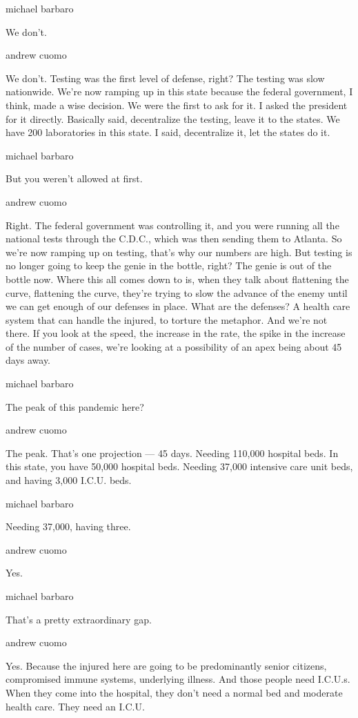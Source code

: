 michael barbaro

We don't.

andrew cuomo

We don't. Testing was the first level of defense, right? The testing was
slow nationwide. We're now ramping up in this state because the federal
government, I think, made a wise decision. We were the first to ask for
it. I asked the president for it directly. Basically said, decentralize
the testing, leave it to the states. We have 200 laboratories in this
state. I said, decentralize it, let the states do it.

michael barbaro

But you weren't allowed at first.

andrew cuomo

Right. The federal government was controlling it, and you were running
all the national tests through the C.D.C., which was then sending them
to Atlanta. So we're now ramping up on testing, that's why our numbers
are high. But testing is no longer going to keep the genie in the
bottle, right? The genie is out of the bottle now. Where this all comes
down to is, when they talk about flattening the curve, flattening the
curve, they're trying to slow the advance of the enemy until we can get
enough of our defenses in place. What are the defenses? A health care
system that can handle the injured, to torture the metaphor. And we're
not there. If you look at the speed, the increase in the rate, the spike
in the increase of the number of cases, we're looking at a possibility
of an apex being about 45 days away.

michael barbaro

The peak of this pandemic here?

andrew cuomo

The peak. That's one projection --- 45 days. Needing 110,000 hospital
beds. In this state, you have 50,000 hospital beds. Needing 37,000
intensive care unit beds, and having 3,000 I.C.U. beds.

michael barbaro

Needing 37,000, having three.

andrew cuomo

Yes.

michael barbaro

That's a pretty extraordinary gap.

andrew cuomo

Yes. Because the injured here are going to be predominantly senior
citizens, compromised immune systems, underlying illness. And those
people need I.C.U.s. When they come into the hospital, they don't need a
normal bed and moderate health care. They need an I.C.U.

